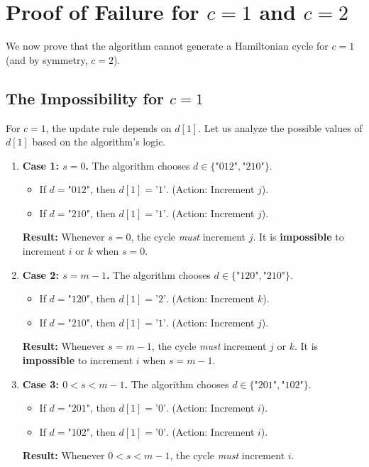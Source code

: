\documentclass[12pt]{article}
\begin{document}
\section{Proof of Failure for $c=1$ and $c=2$}
\label{sec:failure}
We now prove that the algorithm cannot generate a Hamiltonian cycle for $c=1$ (and by symmetry, $c=2$).

\subsection{The Impossibility for $c=1$}
For $c=1$, the update rule depends on $d[1]$. Let us analyze the possible values of $d[1]$ based on the algorithm's logic.

\begin{enumerate}
    \item \textbf{Case 1: $s = 0$.}
    The algorithm chooses $d \in \{\text{"012"}, \text{"210"}\}$.
    \begin{itemize}
        \item If $d = \text{"012"}$, then $d[1] = \text{'1'}$. (Action: Increment $j$).
        \item If $d = \text{"210"}$, then $d[1] = \text{'1'}$. (Action: Increment $j$).
    \end{itemize}
    \textbf{Result:} Whenever $s=0$, the cycle \textit{must} increment $j$. It is \textbf{impossible} to increment $i$ or $k$ when $s=0$.

    \item \textbf{Case 2: $s = m-1$.}
    The algorithm chooses $d \in \{\text{"120"}, \text{"210"}\}$.
    \begin{itemize}
        \item If $d = \text{"120"}$, then $d[1] = \text{'2'}$. (Action: Increment $k$).
        \item If $d = \text{"210"}$, then $d[1] = \text{'1'}$. (Action: Increment $j$).
    \end{itemize}
    \textbf{Result:} Whenever $s=m-1$, the cycle \textit{must} increment $j$ or $k$. It is \textbf{impossible} to increment $i$ when $s=m-1$.

    \item \textbf{Case 3: $0 < s < m-1$.}
    The algorithm chooses $d \in \{\text{"201"}, \text{"102"}\}$.
    \begin{itemize}
        \item If $d = \text{"201"}$, then $d[1] = \text{'0'}$. (Action: Increment $i$).
        \item If $d = \text{"102"}$, then $d[1] = \text{'0'}$. (Action: Increment $i$).
    \end{itemize}
    \textbf{Result:} Whenever $0 < s < m-1$, the cycle \textit{must} increment $i$.
\end{enumerate}
\end{document}
